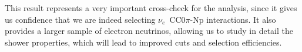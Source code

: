 This result represents a very important cross-check for the analysis, since it gives us confidence that we are indeed selecting $\nu_e$~CC0$\pi$-Np interactions. It also provides a larger sample of electron neutrinos, allowing us to study in detail the shower properties, which will lead to improved cuts and selection efficiencies.